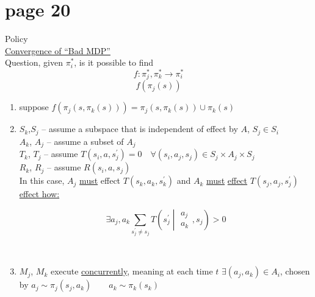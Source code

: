 \section*{page 20}

Policy\\
\underline{Convergence of ``Bad MDP''}\\

Question, given $\pi_i^\ast$, is it possible to find 
\begin{equation*}
f: \pi^\ast_j, \pi^\ast_k \rightarrow \pi^*_i
\end{equation*}
\begin{equation*}
f(\pi_j(s))
\end{equation*}
\begin{enumerate}[label=\alph*)]
\item suppose $f\left(\pi_j\left(s,\pi_k(s)\right)\right)=\pi_j\left( s,\pi_k(s)\right)\cup\pi_k(s)$\\
\item $S_k$,$S_j$ -- assume a subspace that is independent of effect by $A$, $S_j\in S_i$\\
$A_k$, $A_j$ -- assume a subset of $A_j$\\
$T_k$, $T_j$ -- assume $T(s_i,a,s^\prime_j)=0\quad\forall(s_i,a_j,s_j)\in S_j\times A_j \times S_j$\\
$R_k$, $R_j$ -- assume $R(s_i,a,s _j)$\\
In this case, $A_j$ \underline{must} effect $T(s_k,a_k,s^\prime_k)$ and $A_k$ \underline{must} \underline{effect} $T(s_j,a_j,s^\prime_j)$\\
\underline{effect how:}\\

\begin{minipage}{0.5\textwidth}
\begin{equation*}
\exists a_j, a_k \sum_{s^\prime_j\neq s_j}T\left( s^\prime_j \middle| \begin{array}{c} a_j \\ a_k \end{array}, s_j \right) > 0
\end{equation*}
\end{minipage}
\begin{minipage}{0.5\textwidth}
\end{minipage}\\
\item $M_j$, $M_k$ execute \underline{concurrently}, meaning at each time $t$ $\exists(a_j,a_k)\in A_i$, chosen by $a_j\sim \pi_j(s_j,a_k)\qquad a_k\sim\pi_k(s_k)$
\end{enumerate}